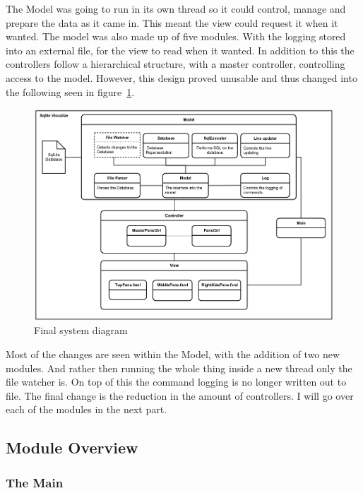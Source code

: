 The Model was going to run in its own thread so it could control, manage and prepare the data as it came in. This meant the view could request it when it wanted. The model was also made up of five modules. With the logging  stored into an external file, for the view to read when it wanted. In addition to this the controllers follow a hierarchical structure, with a master controller, controlling access to the model. However, this design proved unusable and thus changed into the following seen in figure~\ref{fig:design_new}. 

\begin{figure}[H]
	\centering
	\includegraphics[scale=0.2]{images/system_diagram_new.png}
	\caption{Final system diagram}
	\label{fig:design_new}
\end{figure}

Most of the changes are seen within the Model, with the addition of two new modules. And rather then running the whole thing inside a new thread only the file watcher is. On top of this the command logging is no longer written out to file. The final change is the reduction in the amount of controllers. I will go over each of the modules in the next part.

\subsection{Module Overview}
\label{subsec:module_overview}

\subsubsection{The Main}
\label{subsubsec:main}


